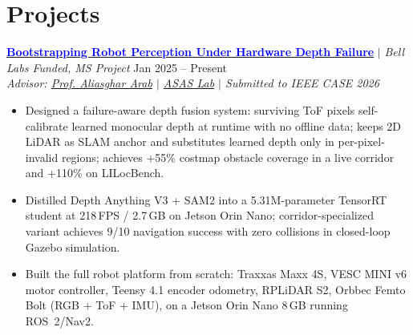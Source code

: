 \documentclass[10pt,letterpaper]{article}
\begin{document}
\section{Projects}

\href{https://github.com/vivekmattam02/ros2-ackermann-racing-navigation}{\textcolor{blue}{\textbf{Bootstrapping Robot Perception Under Hardware Depth Failure}}} $|$ \textit{Bell Labs Funded, MS Project} \hfill Jan 2025 -- Present \\
\textit{Advisor: \href{https://wp.nyu.edu/aarab/}{Prof. Aliasghar Arab} $|$ \href{https://wp.nyu.edu/asas_labs/about-project/}{ASAS Lab} $|$ Submitted to IEEE CASE 2026}
\begin{itemize}
    \item Designed a failure-aware depth fusion system: surviving ToF pixels self-calibrate learned monocular depth at runtime with no offline data; keeps 2D LiDAR as SLAM anchor and substitutes learned depth only in per-pixel-invalid regions; achieves +55\% costmap obstacle coverage in a live corridor and +110\% on LILocBench.
    \item Distilled Depth Anything V3 + SAM2 into a 5.31M-parameter TensorRT student at 218\,FPS / 2.7\,GB on Jetson Orin Nano; corridor-specialized variant achieves 9/10 navigation success with zero collisions in closed-loop Gazebo simulation.
    \item Built the full robot platform from scratch: Traxxas Maxx 4S, VESC MINI v6 motor controller, Teensy 4.1 encoder odometry, RPLiDAR S2, Orbbec Femto Bolt (RGB + ToF + IMU), on a Jetson Orin Nano 8\,GB running ROS~2/Nav2.
\end{itemize}
\vspace{1pt}
\end{document}
